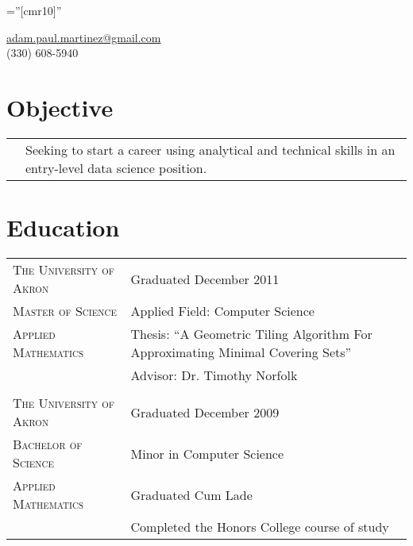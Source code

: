 \documentclass[letterpaper,10pt]{article} %
\begin{document}
\pagestyle{empty} %

\font\fb=''[cmr10]'' %


\par{\medskip\par} %

\begin{center}
\href{mailto:adam.paul.martinez@gmail.com}{adam.paul.martinez@gmail.com} \\
(330) 608-5940
\end{center}

\section{Objective}
\begin{center}
\begin{tabular}{R{4.25cm}L{11.25cm}}
& Seeking to start a career using analytical and technical skills in an entry-level data science position.
\end{tabular}
\end{center}


\section{Education}

\begin{center}
\begin{tabular}{R{4.25cm}L{11.25cm}}

\textsc{The University of Akron} & Graduated December 2011\\
\textsc{Master of Science} & Applied Field: Computer Science\\
\textsc{Applied Mathematics} &  Thesis: ``A Geometric Tiling Algorithm For Approximating Minimal Covering Sets''\\
&  Advisor: Dr. Timothy Norfolk\\
 \\


\textsc{The University of Akron} & Graduated December 2009\\
\textsc{Bachelor of Science} & Minor in Computer Science\\
\textsc{Applied Mathematics} &  Graduated Cum Lade\\
&  Completed the Honors College course of study

\end{tabular}
\end{center}
\end{document}
